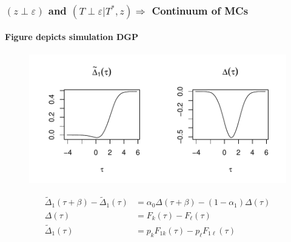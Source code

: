 \documentclass{beamer}
\begin{document}
\begin{frame}
  \frametitle{$(z \perp \varepsilon)$ and $(T\perp \varepsilon|T^*,z) \Rightarrow$ Continuum of MCs}
  \framesubtitle{Figure depicts simulation DGP}

    \vspace{-0.7em}
  \begin{figure}[h]
    \centering
    \includegraphics[width=\textwidth]{Delta_sim}
  \end{figure}
    
    \vspace{-4em}
\begin{align*}
    \widetilde{\Delta}_1(\tau+\beta) - \widetilde{\Delta}_1(\tau) &= \alpha_0 \Delta(\tau + \beta) - (1 - \alpha_1) \Delta(\tau)\\
  \Delta(\tau) &= F_k(\tau) - F_\ell(\tau)\\
  \widetilde{\Delta}_1(\tau) &= p_k F_{1k}(\tau) - p_\ell F_{1\ell}(\tau)
\end{align*}


  \normalsize
\end{frame}
\end{document}
